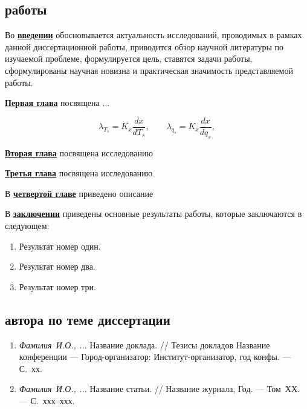 
\subsection*{ работы}
Во \underline{\textbf{введении}} обосновывается актуальность исследований, проводимых в рамках данной диссертационной работы, приводится обзор научной литературы по изучаемой проблеме, формулируется цель, ставятся задачи работы, сформулированы научная новизна и практическая значимость представляемой работы.

\underline{\textbf{Первая глава}} посвящена ...


$$
\lambda_{T_s} = K_x\frac{d{x}}{d{T_s}}, \qquad
\lambda_{q_s} = K_x\frac{d{x}}{d{q_s}},
$$

\underline{\textbf{Вторая глава}} посвящена исследованию 

\underline{\textbf{Третья глава}} посвящена исследованию 

В \underline{\textbf{четвертой главе}} приведено описание 

В \underline{\textbf{заключении}} приведены основные результаты работы, которые заключаются в следующем:
\begin{enumerate}
 \item Результат номер один.
 \item Результат номер два.
 \item Результат номер три.
\end{enumerate}


\subsection*{ автора по теме диссертации}
\begin{enumerate}
 \item \emph{Фамилия~И.О., ...} Название доклада. // Тезисы докладов Название конференции --- Город-организатор: Институт-организатор, год конфы. --- С.~хх.

 \item \emph{Фамилия~И.О., ...} Название статьи. // Название журнала, Год. --- Том~ХХ. --- С.~ххх--ххх.
\end{enumerate}
